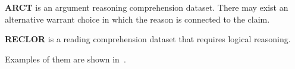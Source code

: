 \textbf{ARCT} is an argument reasoning comprehension dataset. 
There may exist an alternative warrant choice 
in which the reason is connected to the claim.

\textbf{RECLOR} is a reading comprehension dataset that requires logical reasoning.

Examples of them are shown in~. 

%

